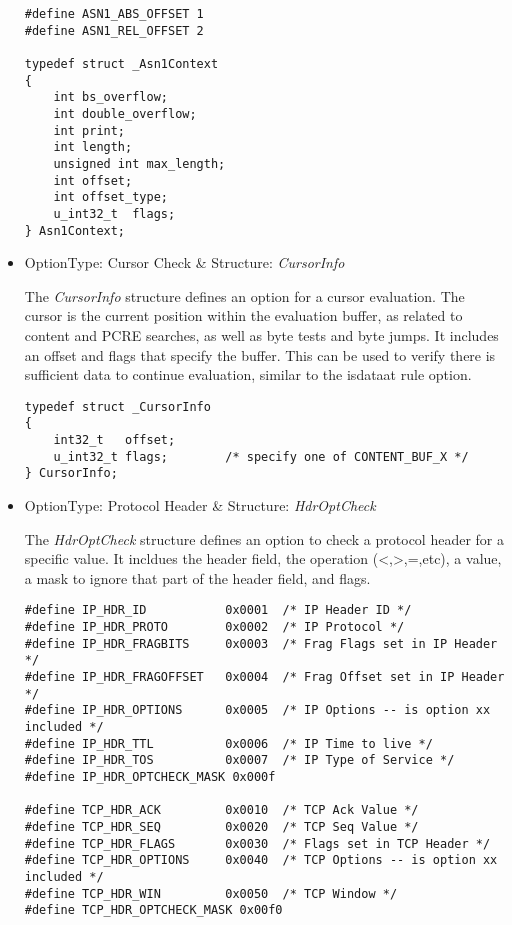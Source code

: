 \documentclass[english]{report}
\begin{document}
\begin{itemize}
\begin{verbatim}
#define ASN1_ABS_OFFSET 1
#define ASN1_REL_OFFSET 2

typedef struct _Asn1Context
{
    int bs_overflow;
    int double_overflow;
    int print;
    int length;
    unsigned int max_length;
    int offset;
    int offset_type;
    u_int32_t  flags;
} Asn1Context;
\end{verbatim}

\item {OptionType: Cursor Check \& Structure: {\em CursorInfo}}

The {\em CursorInfo} structure defines an option for a cursor
evaluation.  The cursor is the current position within the
evaluation buffer, as related to content and PCRE searches,
as well as byte tests and byte jumps.  It includes an offset
and flags that specify the buffer.  This can be used to
verify there is sufficient data to continue evaluation,
similar to the isdataat rule option.  

\begin{verbatim}
typedef struct _CursorInfo
{
    int32_t   offset;
    u_int32_t flags;        /* specify one of CONTENT_BUF_X */
} CursorInfo;
\end{verbatim}

\item {OptionType: Protocol Header \& Structure: {\em HdrOptCheck}}

The {\em HdrOptCheck} structure defines an option to check a
protocol header for a specific value.  It incldues the header
field, the operation (<,>,=,etc), a value, a mask to ignore
that part of the header field, and flags.

\begin{verbatim}
#define IP_HDR_ID           0x0001  /* IP Header ID */
#define IP_HDR_PROTO        0x0002  /* IP Protocol */
#define IP_HDR_FRAGBITS     0x0003  /* Frag Flags set in IP Header */
#define IP_HDR_FRAGOFFSET   0x0004  /* Frag Offset set in IP Header */
#define IP_HDR_OPTIONS      0x0005  /* IP Options -- is option xx included */
#define IP_HDR_TTL          0x0006  /* IP Time to live */
#define IP_HDR_TOS          0x0007  /* IP Type of Service */
#define IP_HDR_OPTCHECK_MASK 0x000f

#define TCP_HDR_ACK         0x0010  /* TCP Ack Value */
#define TCP_HDR_SEQ         0x0020  /* TCP Seq Value */
#define TCP_HDR_FLAGS       0x0030  /* Flags set in TCP Header */
#define TCP_HDR_OPTIONS     0x0040  /* TCP Options -- is option xx included */
#define TCP_HDR_WIN         0x0050  /* TCP Window */
#define TCP_HDR_OPTCHECK_MASK 0x00f0


\end{verbatim}
\end{itemize}
\end{document}
